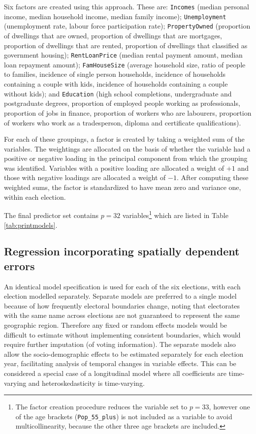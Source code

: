 \documentclass[times, doublespace]{anzsauth}
\let\rmarkdownfootnote\footnote%
\def\footnote{\protect\rmarkdownfootnote}
\begin{document}
Six factors are created using this approach. These are:
\texttt{Incomes} (median personal income, median household income, median family income);
\texttt{Unemployment} (unemployment rate, labour force participation rate);
\texttt{PropertyOwned} (proportion of dwellings that are owned, proportion of dwellings that are mortgages, proportion of dwellings that are rented, proportion of dwellings that classified as government housing);
\texttt{RentLoanPrice} (median rental payment amount, median loan repayment amount);
\texttt{FamHouseSize} (average household size, ratio of people to families, incidence of single person households, incidence of households containing a couple with kids, incidence of households containing a couple without kids); and
\texttt{Education} (high school completions, undergraduate and postgraduate degrees, proportion of employed people working as professionals, proportion of jobs in finance, proportion of workers who are labourers, proportion of workers who work as a tradesperson, diploma and certificate qualifications).

For each of these groupings, a factor is created by taking a weighted sum of the variables. The weightings are allocated on the basis of whether the variable had a positive or negative loading in the principal component from which the grouping was identified. Variables with a positive loading are allocated a weight of \(+1\) and those with negative loadings are allocated a weight of \(-1\). After computing these weighted sums, the factor is standardized to have mean zero and variance one, within each election.

The final predictor set contains \(p=32\) variables\footnote{The factor creation procedure reduces the variable set to \(p=33\), however one of the age brackets (\texttt{Pop\_55\_plus}) is not included as a variable to avoid multicollinearity, because the other three age brackets are included.} which are listed in Table \ref{tab:printmodels}.

\hypertarget{regression-incorporating-spatially-dependent-errors}{%
\subsection{Regression incorporating spatially dependent errors}\label{regression-incorporating-spatially-dependent-errors}}

An identical model specification is used for each of the six elections, with each election modelled separately. Separate models are preferred to a single model because of how frequently electoral boundaries change, noting that electorates with the same name across elections are not guaranteed to represent the same geographic region. Therefore any fixed or random effects models would be difficult to estimate without implementing consistent boundaries, which would require further imputation (of voting information). The separate models also allow the socio-demographic effects to be estimated separately for each election year, facilitating analysis of temporal changes in variable effects. This can be considered a special case of a longitudinal model where all coefficients are time-varying and heteroskedasticity is time-varying.
\end{document}
